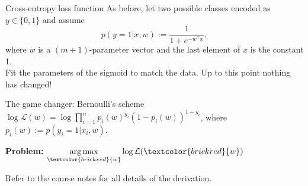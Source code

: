 \documentclass[UKenglish,aspectratio=169]{beamer}
\DeclareMathOperator*{\argmax}{arg\,max}
\newcommand\unknown[1]{\textcolor{brickred}{#1}}
\begin{document}

\begin{frame}{Cross-entropy loss function}
As before, let two possible classes encoded as $y \in \{0,1\}$ and assume
$$
p(y=1|x,w) := \frac{1}{1+e^{-w^\top x}},
$$
where $w$ is a $(m+1)$-parameter vector and the last element of $x$ is the constant 1.\\

\pause
Fit the parameters of the sigmoid to match the data.
Up to this point nothing has changed!
\pause

\vspace{1ex}
\begin{block}{The game changer: Bernoulli's scheme}
$\log \mathcal{L}(w) = \log \prod_{i=1}^n p_i(w)^{y_i}  (1-p_i(w))^{1-y_i}$,
\quad where $p_i(w):=p(y_i=1|x_i, w)$.

\vspace{1ex}

\textbf{Problem:} $\argmax\limits_{\unknown{w}} \log\mathcal{L}(\unknown{w})$
\end{block}
Refer to the course notes for all details of the derivation.
\end{frame}
\end{document}
